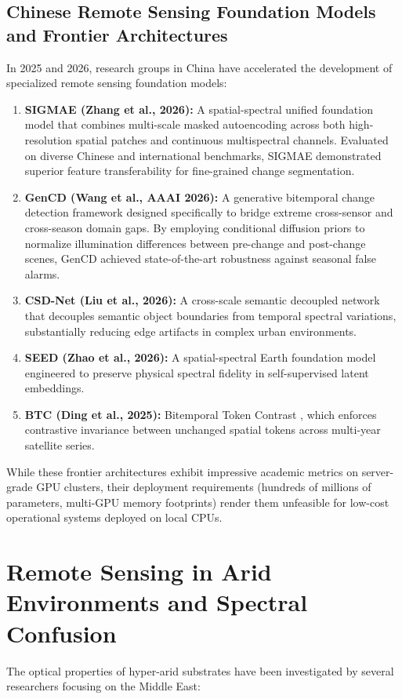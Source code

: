 \subsection{Chinese Remote Sensing Foundation Models and Frontier Architectures}
In 2025 and 2026, research groups in China have accelerated the development of specialized remote sensing foundation models:
\begin{enumerate}
    \item \textbf{SIGMAE (Zhang et al., 2026):} A spatial-spectral unified foundation model \citep{zhang2026sigmae} that combines multi-scale masked autoencoding across both high-resolution spatial patches and continuous multispectral channels. Evaluated on diverse Chinese and international benchmarks, SIGMAE demonstrated superior feature transferability for fine-grained change segmentation.
    \item \textbf{GenCD (Wang et al., AAAI 2026):} A generative bitemporal change detection framework \citep{wang2026gencd} designed specifically to bridge extreme cross-sensor and cross-season domain gaps. By employing conditional diffusion priors to normalize illumination differences between pre-change and post-change scenes, GenCD achieved state-of-the-art robustness against seasonal false alarms.
    \item \textbf{CSD-Net (Liu et al., 2026):} A cross-scale semantic decoupled network \citep{liu2026csdnet} that decouples semantic object boundaries from temporal spectral variations, substantially reducing edge artifacts in complex urban environments.
    \item \textbf{SEED (Zhao et al., 2026):} A spatial-spectral Earth foundation model \citep{zhao2026seed} engineered to preserve physical spectral fidelity in self-supervised latent embeddings.
    \item \textbf{BTC (Ding et al., 2025):} Bitemporal Token Contrast \citep{ding2025btc}, which enforces contrastive invariance between unchanged spatial tokens across multi-year satellite series.
\end{enumerate}

While these frontier architectures exhibit impressive academic metrics on server-grade GPU clusters, their deployment requirements (hundreds of millions of parameters, multi-GPU memory footprints) render them unfeasible for low-cost operational systems deployed on local CPUs.

\section{Remote Sensing in Arid Environments and Spectral Confusion}
\label{sec:lit_arid_spectroscopy}
The optical properties of hyper-arid substrates have been investigated by several researchers focusing on the Middle East:

